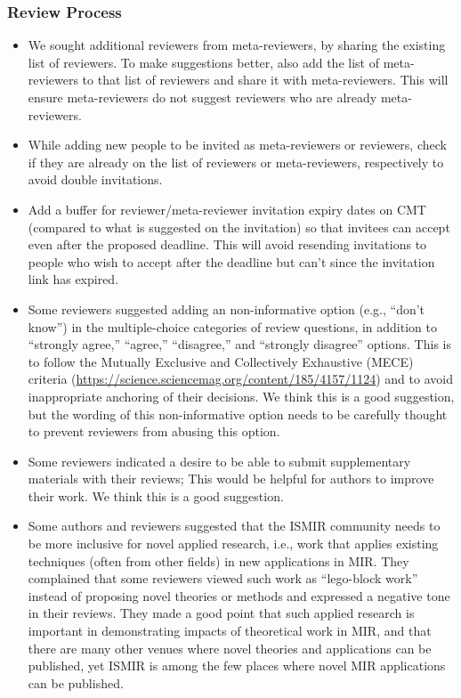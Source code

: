 \documentclass[%
10pt,								%
titlepage,						%
]
{scrartcl}
\begin{document}
        \subsubsection{Review Process}
            \begin{itemize}
                \item   We sought additional reviewers from meta-reviewers, by sharing the existing list of reviewers. To make suggestions better, also add the list of meta-reviewers to that list of reviewers and share it with meta-reviewers. This will ensure meta-reviewers do not suggest reviewers who are already meta-reviewers.
                \item   While adding new people to be invited as meta-reviewers or reviewers, check if they are already on the list of reviewers or meta-reviewers, respectively to avoid double invitations.
                \item   Add a buffer for reviewer/meta-reviewer invitation expiry dates on CMT (compared to what is suggested on the invitation) so that invitees can accept even after the proposed deadline. This will avoid resending invitations to people who wish to accept after the deadline but can't since the invitation link has expired.
                \item   Some reviewers suggested adding an non-informative option (e.g., ``don't know'') in the multiple-choice categories of review questions, in addition to ``strongly agree,'' ``agree,'' ``disagree,'' and ``strongly disagree'' options. This is to follow the Mutually Exclusive and Collectively Exhaustive (MECE) criteria (\href{https://science.sciencemag.org/content/185/4157/1124}{https://science.sciencemag.org/content/185/4157/1124}) and to avoid inappropriate anchoring of their decisions. We think this is a good suggestion, but the wording of this non-informative option needs to be carefully thought to prevent reviewers from abusing this option.
                \item   Some reviewers indicated a desire to be able to submit supplementary materials with their reviews; This would be helpful for authors to improve their work. We think this is a good suggestion.
                \item   Some authors and reviewers suggested that the ISMIR community needs to be more inclusive for novel applied research, i.e., work that applies existing techniques (often from other fields) in new applications in MIR. They complained that some reviewers viewed such work as ``lego-block work'' instead of proposing novel theories or methods and expressed a negative tone in their reviews. They made a good point that such applied research is important in demonstrating impacts of theoretical work in MIR, and that there are many other venues where novel theories and applications can be published, yet ISMIR is among the few places where novel MIR applications can be published.

\end{itemize}
\end{document}
